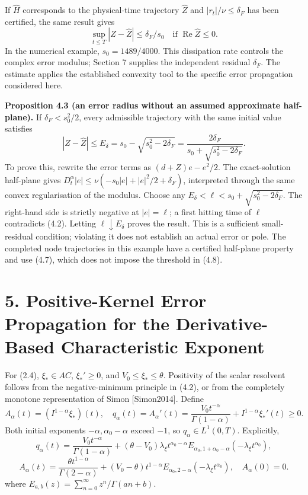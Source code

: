 \documentclass[a4paper,11pt]{article}
\begin{document}
If \(\widehat H\) corresponds to the physical-time trajectory \(\widehat Z\) and \(|r_t|/\nu\le\delta_F\) has been certified, the same result gives
\[
\sup_{t\le T}|Z-\widehat Z|\le\delta_F/s_0
\quad\text{if }\operatorname{Re}\widehat Z\le0.
\tag{4.7}
\]
In the numerical example, \(s_0=1489/4000\). This dissipation rate controls the complex error modulus; Section 7 supplies the independent residual \(\delta_F\). The estimate applies the established convexity tool to the specific error propagation considered here.

\textbf{Proposition 4.3 (an error radius without an assumed approximate half-plane).} If \(\delta_F<s_0^2/2\), every admissible trajectory with the same initial value satisfies
\[
|Z-\widehat Z|\le E_\delta
=s_0-\sqrt{s_0^2-2\delta_F}
=\frac{2\delta_F}{s_0+\sqrt{s_0^2-2\delta_F}}.
\tag{4.8}
\]
To prove this, rewrite the error terms as \((d+Z)e-e^2/2\). The exact-solution half-plane gives
\(D_t^\alpha|e|\le\nu(-s_0|e|+|e|^2/2+\delta_F)\), interpreted through the same convex regularisation of the modulus. Choose any \(E_\delta<\ell<s_0+\sqrt{s_0^2-2\delta_F}\). The right-hand side is strictly negative at \(|e|=\ell\); a first hitting time of \(\ell\) contradicts (4.2). Letting \(\ell\downarrow E_\delta\) proves the result. This is a sufficient small-residual condition; violating it does not establish an actual error or pole. The completed node trajectories in this example have a certified half-plane property and use (4.7), which does not impose the threshold in (4.8).

\section*{5. Positive-Kernel Error Propagation for the Derivative-Based Characteristic Exponent}

For (2.4), \(\xi_*\in AC\), \(\xi_*'\ge0\), and \(V_0\le\xi_*\le\theta\). Positivity of the scalar resolvent follows from the negative-minimum principle in (4.2), or from the completely monotone representation of Simon [Simon2014]. Define
\[
A_\alpha(t)=(I^{1-\alpha}\xi_*)(t),\quad
q_\alpha(t)=A_\alpha'(t)
=\frac{V_0t^{-\alpha}}{\Gamma(1-\alpha)}+I^{1-\alpha}\xi_*'(t)\ge0.
\tag{5.1}
\]
Both initial exponents \(-\alpha,\alpha_0-\alpha\) exceed \(-1\), so \(q_\alpha\in L^1(0,T)\). Explicitly,
\[
q_\alpha(t)=\frac{V_0t^{-\alpha}}{\Gamma(1-\alpha)}
 +(\theta-V_0)\lambda_\xi t^{\alpha_0-\alpha}
 E_{\alpha_0,1+\alpha_0-\alpha}(-\lambda_\xi t^{\alpha_0}),
\tag{5.2}
\]
\[
A_\alpha(t)=\frac{\theta t^{1-\alpha}}{\Gamma(2-\alpha)}
 +(V_0-\theta)t^{1-\alpha}
 E_{\alpha_0,2-\alpha}(-\lambda_\xi t^{\alpha_0}),\quad A_\alpha(0)=0.
\tag{5.3}
\]
where \(E_{a,b}(z)=\sum_{n=0}^\infty z^n/\Gamma(an+b)\).
\end{document}
